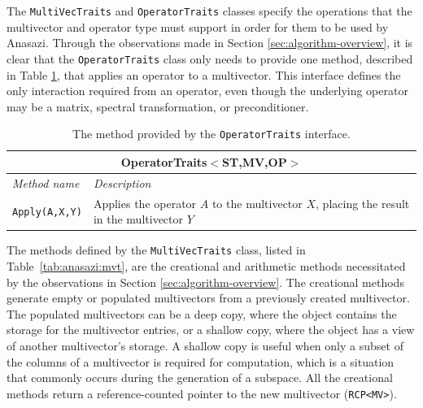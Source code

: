 \documentclass[acmtoms,acmnow]{acmtrans2m}
\newcommand{\aspace}[1]{\texttt{#1}}
\begin{document}
The \aspace{MultiVecTraits} and \aspace{OperatorTraits} classes specify
the operations that the multivector and operator type must support in order for them to be
used by Anasazi. Through the observations made in Section \ref{sec:algorithm-overview}, 
it is clear that the \aspace{OperatorTraits} class only needs to provide one method,
described in Table \ref{tab:anasazi:opt}, that applies an operator to a multivector.  
This interface defines the only interaction required from an operator, even though
the underlying operator may be a matrix, 
spectral transformation, or preconditioner.
\begin{table}[bth]
\begin{center}
  \caption{The method provided by the \aspace{OperatorTraits} interface.}
\label{tab:anasazi:opt}
\begin{tabular}{| p{4cm} | p{8cm} |}
\hline
\multicolumn{2}{|c|}{\textbf{OperatorTraits$<$ST,MV,OP$>$}} \\\hline
\emph{Method name} & \emph{Description} \\\hline
{\tt Apply(A,X,Y)} & Applies the operator $A$ to the multivector $X$, placing the
result in the multivector $Y$ \\
\hline
\end{tabular}
\end{center}
\end{table}

The methods defined by the \aspace{MultiVecTraits} class, listed in
Table~\ref{tab:anasazi:mvt}, are the creational and arithmetic methods necessitated
by the observations in Section \ref{sec:algorithm-overview}.
The creational methods generate empty or populated multivectors from a previously
created multivector. The populated multivectors can be 
a deep copy, where the object contains the storage for the multivector entries, or a shallow copy, 
where the object has a view of another multivector's storage.
A shallow copy is useful when only a
subset of the columns of a multivector is required for computation, which is a situation that 
commonly occurs during the generation of a subspace. All the creational methods return
a reference-counted pointer \cite{Detlefs:1992:GCR,Teuchos-RCP} to the new multivector (\aspace{RCP<MV>}). 
\end{document}
